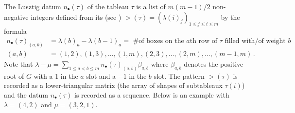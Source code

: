\documentclass[draft]{article} %
\begin{document}
The Lusztig datum $n_\bullet(\tau)$ of the tableau $\tau$ is a list of $ m(m-1)/2$ non-negative integers defined from its  (see \cite[Sect.~4]{berenstein1988tensor}) $\gt(\tau) = (\lambda(i)_j)_{1\le j\le i\le m}$ by the formula 
$$
\begin{aligned}
n_\bullet(\tau)_{(a,b)} &= \lambda(b)_a - \lambda(b-1)_a = \text{ \# of boxes on the $a$th row of $\tau $ filled with/of weight $b$}  \\
(a,b) &=  (1,2),(1,3),\dots,(1,m),%
(2,3),\dots,(2,m),%
\dots,%
(m-1,m)\,. 
\end{aligned}
$$
Note that $ \lambda - \mu = \displaystyle{\sum_{1 \le a < b \le m}n_\bullet(\tau)_{(a,b)} \beta_{a,b}} $ where $ \beta_{a,b} $ denotes the positive root of $ G$ with a $ 1 $ in the $a $ slot and a $-1$ in the $ b $ slot.
% 
The pattern $\gt(\tau)$ is recorded as a lower-triangular matrix (the array of shapes of subtableaux $\tau(i)$) and the datum $n_\bullet(\tau)$ is recorded as a sequence. Below is an example with $\lambda = (4,2)$ and $\mu = (3,2,1)$. 

\end{document}
